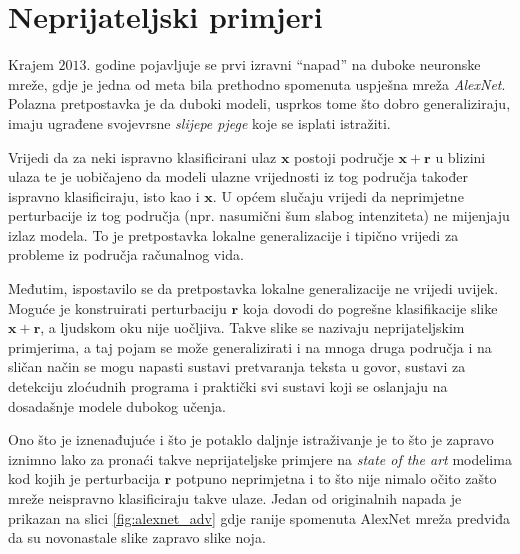 \documentclass[utf8, diplomski]{fer}
\begin{document}
\section{Neprijateljski primjeri}
Krajem $2013.$ godine pojavljuje se prvi izravni ``napad'' na duboke neuronske mreže\citep{Szegedy2014IntriguingPO}, gdje je jedna od meta bila prethodno spomenuta uspješna mreža \textit{AlexNet}. Polazna pretpostavka je da duboki modeli, usprkos tome što dobro generaliziraju, imaju ugrađene svojevrsne \textit{slijepe pjege} koje se isplati istražiti.
\par
Vrijedi da za neki ispravno klasificirani ulaz $\boldsymbol{x}$ postoji područje $\boldsymbol{x} + \boldsymbol{r}$ u blizini ulaza te je uobičajeno da modeli ulazne vrijednosti iz tog područja također ispravno klasificiraju, isto kao i $\boldsymbol{x}$. U općem slučaju vrijedi da neprimjetne perturbacije iz tog područja (npr. nasumični šum slabog intenziteta) ne mijenjaju izlaz modela. To je pretpostavka lokalne generalizacije i tipično vrijedi za probleme iz područja računalnog vida.
\par
Međutim, ispostavilo se da pretpostavka lokalne generalizacije ne vrijedi uvijek. Moguće je konstruirati perturbaciju $\boldsymbol{r}$ koja dovodi do pogrešne klasifikacije slike $\boldsymbol{x} + \boldsymbol{r}$, a ljudskom oku nije uočljiva. Takve slike se nazivaju neprijateljskim primjerima, a taj pojam se može generalizirati i na mnoga druga područja i na sličan način se mogu napasti sustavi pretvaranja teksta u govor, sustavi za detekciju zloćudnih programa i praktički svi sustavi koji se oslanjaju na dosadašnje modele dubokog učenja. 
\par
Ono što je iznenađujuće i što je potaklo daljnje istraživanje je to što je zapravo iznimno lako za pronaći takve neprijateljske primjere na \textit{state of the art} modelima kod kojih je perturbacija $\boldsymbol{r}$ potpuno neprimjetna i to što nije nimalo očito zašto mreže neispravno klasificiraju takve ulaze. Jedan od originalnih napada je prikazan na slici \ref{fig:alexnet_adv} gdje ranije spomenuta AlexNet mreža predviđa da su novonastale slike zapravo slike noja.
\end{document}
